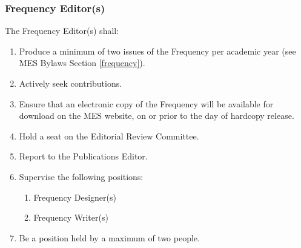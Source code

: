 
\subsubsection{Frequency Editor(s)}
\label{frequency-editors}
The Frequency Editor(s) shall:

\begin{enumerate}
 \item
  Produce a minimum of two issues of the Frequency per academic year (see MES Bylaws Section \ref{frequency}).
 \item
  Actively seek contributions.
 \item
  Ensure that an electronic copy of the Frequency will be available for download on the MES website, on or prior to the day of hardcopy release.
 \item     
  Hold a seat on the Editorial Review Committee. 
 \item    
  Report to the Publications Editor.
 \item
  Supervise the following positions: 
  \begin{enumerate} 
    \item    
     Frequency Designer(s) 
    \item     
     Frequency Writer(s)   
  \end{enumerate} 
 \item  
  Be a position held by a maximum of two people.

\end{enumerate}